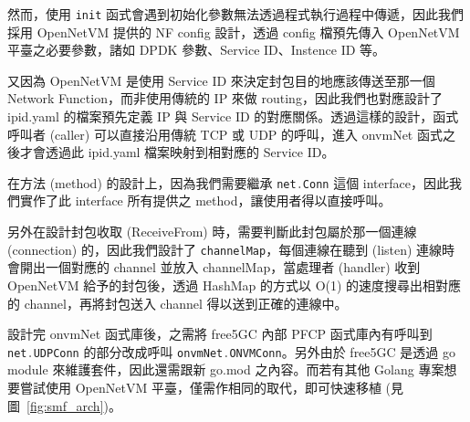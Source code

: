 然而，使用 \lstinline[language=Go]{init} 函式會遇到初始化參數無法透過程式執行過程中傳遞，因此我們採用 OpenNetVM 提供的 NF config 設計，透過 config 檔預先傳入 OpenNetVM 平臺之必要參數，諸如 DPDK 參數、Service ID、Instence ID 等。

又因為 OpenNetVM 是使用 Service ID 來決定封包目的地應該傳送至那一個 Network Function，而非使用傳統的 IP 來做 routing，因此我們也對應設計了 ipid.yaml 的檔案預先定義 IP 與 Service ID 的對應關係。透過這樣的設計，函式呼叫者 (caller) 可以直接沿用傳統 TCP 或 UDP 的呼叫，進入 onvmNet 函式之後才會透過此 ipid.yaml 檔案映射到相對應的 Service ID。

在方法 (method) 的設計上，因為我們需要繼承 \lstinline[language=Go]{net.Conn} 這個 interface，因此我們實作了此 interface 所有提供之 method，讓使用者得以直接呼叫。

另外在設計封包收取 (ReceiveFrom) 時，需要判斷此封包屬於那一個連線 (connection) 的，因此我們設計了 \lstinline{channelMap}，每個連線在聽到 (listen) 連線時會開出一個對應的 channel 並放入 channelMap，當處理者 (handler) 收到 OpenNetVM 給予的封包後，透過 HashMap 的方式以 O(1) 的速度搜尋出相對應的 channel，再將封包送入 channel 得以送到正確的連線中。


設計完 onvmNet 函式庫後，之需將 free5GC 內部 PFCP 函式庫內有呼叫到 \lstinline[language=Go]{net.UDPConn} 的部分改成呼叫 \lstinline[language=Go]{onvmNet.ONVMConn}。另外由於 free5GC 是透過 go module 來維護套件，因此還需跟新 go.mod 之內容。而若有其他 Golang 專案想要嘗試使用 OpenNetVM 平臺，僅需作相同的取代，即可快速移植 (見圖~\ref{fig:smf_arch})。

